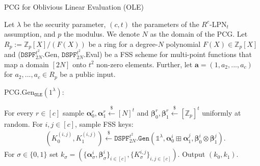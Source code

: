 \begin{specialconstruction}{PCG for Oblivious Linear Evaluation (OLE)}
\label{construction:PCGforOLEImpl}
\vspace{1em} 

Let $\lambda$ be the security parameter, $(c,t)$ the parameters of the $R^c$-LPN$_t$ assumption, and $p$ the modulus. We denote $N$ as the domain of the PCG. Let $R_p:=\mathbb{Z}_{p}[X]/(F(X))$ be a ring for a degree-$N$ polynomial $F(X) \in \mathbb{Z}_{p}[X]$ and ($\texttt{DSPF}^{t^2}_{2N}$.Gen, $\texttt{DSPF}^{t^2}_{2N}$.Eval) be a FSS scheme for multi-point functions that map a domain $[2N]$ onto $t^2$ non-zero elements. Further, let $\boldsymbol{a} = (1, a_2, ..., a_c)$ for $a_2, ...,a_c \in R_p$ be a public input.

\vspace{1em} 

PCG.Gen$_{\texttt{OLE}}(1^\lambda)$:
\begin{algorithmic}[1]
\State For every $r \in [c]$ sample $\boldsymbol{\alpha}_{0}^{r}, \boldsymbol{\alpha}_{1}^{r} \stackrel{\$}{\leftarrow}[N]^{t}$ and $\boldsymbol{\beta}_{0}^{r}, \boldsymbol{\beta}_{1}^{r} \stackrel{\$}{\leftarrow} [\mathbb{Z}_{p}]^{t}$ uniformly at random.
\State For $i, j \in [c]$, sample FSS keys:
\begin{align*}
& \left(K_{0}^{(i, j)}, K_{1}^{(i, j)}\right) \stackrel{\$}{\leftarrow} \texttt{DSPF}^{t^2}_{2N}\texttt{.Gen}\left(\mathds{1}^{\lambda}, \boldsymbol{\alpha}_{0}^{i} \boxplus \boldsymbol{\alpha}_{1}^{j}, \boldsymbol{\beta}_{0}^{i} \otimes \boldsymbol{\beta}_{1}^{j}\right).
\end{align*}
\State For $\sigma \in \{0,1\}$ set $k_\sigma = (\{\boldsymbol{\alpha}_\sigma^i, \boldsymbol{\beta}_\sigma^i\}_{i\in[c]}, \{K_\sigma^{i,j}\}_{i,j\in[c]})$.
\State Output $(k_0, k_1)$.
\end{algorithmic}

\vspace{1em} %


\end{specialconstruction}
